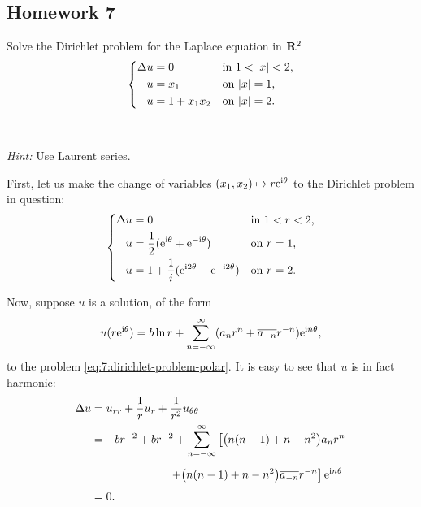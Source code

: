 \subsection{Homework 7}
\begin{problem}
  Solve the Dirichlet problem for the Laplace equation in \(\mathbf{R}^2\)
  \[
    \left\{
      \begin{aligned}
        \Lap u&=0&&\text{in \(1<|x|<2\),}\\
        u&=x_1&&\text{on \(|x|=1\),}\\
        u&=1+x_1x_2&&\text{on \(|x|=2\).}
      \end{aligned}
    \right.
  \]
  \\\\
  \emph{Hint:} Use Laurent series.
\end{problem}
\begin{solution*}
  First, let us make the change of variables \((x_1,x_2)\mapsto
  r\mathrm{e}^{\mathrm{i}\theta}\) to the Dirichlet problem in question:
  \begin{equation}
    \label{eq:7:dirichlet-problem-polar}
    \left\{
      \begin{aligned}
        \Delta u&=0&&\text{in \(1<r<2\),}\\
        u&=\frac{1}{2}(\mathrm{e}^{\mathrm{i}\theta}+\mathrm{e}^{-\mathrm{i}\theta})&&\text{on \(r=1\),}\\
        u&=1+\frac{1}{i}(\mathrm{e}^{\mathrm{i} 2\theta}-\mathrm{e}^{-\mathrm{i} 2\theta})&&\text{on \(r=2\).}
      \end{aligned}
    \right.
  \end{equation}

  Now, suppose \(u\) is a solution, of the form
  \[
    u(r\rme^{\rmi\theta})=%
    b\ln r%
    +\sum_{n=-\infty}^\infty (a_nr^n+\overline{a_{-n}}r^{-n})\rme^{\rmi n\theta},
  \]
  to the problem \eqref{eq:7:dirichlet-problem-polar}. It is easy to see
  that \(u\) is in fact harmonic:
  \begin{align*}
    \Lap u%
    &=u_{rr}+\frac{1}{r}u_r+\frac{1}{r^2}u_{\theta\theta}\\
    &=-br^{-2}+br^{-2}+\sum_{n=-\infty}^\infty
      \left[\bigl(n(n-1)+n-n^2\bigr) a_nr^n\right.\\
    &\phantom{{}={}-\frac{b}{r^2}+\frac{b}{r^2}+}
      \left.+\bigl(n(n-1)+n-n^2\bigr)\overline{a_{-n}}r^{-n}\right]\rme^{\rmi
      n\theta}\\
    &=0.
  \end{align*}


\end{solution*}
